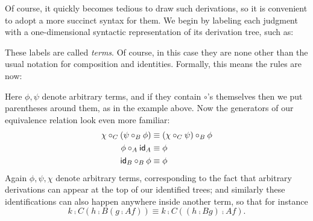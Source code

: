 Of course, it quickly becomes tedious to draw such derivations, so it is convenient to adopt a more succinct syntax for them.
We begin by labeling each judgment with a one-dimensional syntactic representation of its derivation tree, such as:
\begin{mathpar}
\end{mathpar}
These labels are called \emph{terms}.
Of course, in this case they are none other than the usual notation for composition and identities.
Formally, this means the rules are now:
Here $\phi,\psi$ denote arbitrary terms, and if they contain $\circ$'s themselves then we put parentheses around them, as in the example above.
Now the generators of our equivalence relation look even more familiar:
\begin{align*}
  \chi \comp{C} (\psi \comp{B} \phi) &\equiv (\chi\comp{C}\psi)\comp{B}\phi\\
  \phi \comp{A} \idfunc_A &\equiv \phi\\
  \idfunc_B \comp{B} \phi &\equiv \phi
\end{align*}
Again $\phi,\psi,\chi$ denote arbitrary terms, corresponding to the fact that arbitrary derivations can appear at the top of our identified trees; and similarly these identifications can also happen anywhere inside another term, so that for instance
\[ k\comp{C} (h\comp{B} (g\comp{A} f)) \equiv k\comp{C} ((h\comp{B} g)\comp{A} f).  \]

